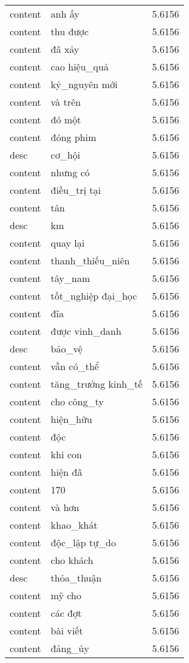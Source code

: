 \documentclass{article}
\begin{document}
\begin{tabular}{lll}
content & anh ấy & 5.6156\\
content & thu được & 5.6156\\
content & đã xảy & 5.6156\\
content & cao hiệu\_quả & 5.6156\\
content & kỷ\_nguyên mới & 5.6156\\
content & và trên & 5.6156\\
content & đó một & 5.6156\\
content & đóng phim & 5.6156\\
desc & cơ\_hội & 5.6156\\
content & nhưng có & 5.6156\\
content & điều\_trị tại & 5.6156\\
content & tân & 5.6156\\
desc & km & 5.6156\\
content & quay lại & 5.6156\\
content & thanh\_thiếu\_niên & 5.6156\\
content & tây\_nam & 5.6156\\
content & tốt\_nghiệp đại\_học & 5.6156\\
content & đĩa & 5.6156\\
content & được vinh\_danh & 5.6156\\
desc & bảo\_vệ & 5.6156\\
content & vẫn có\_thể & 5.6156\\
content & tăng\_trưởng kinh\_tế & 5.6156\\
content & cho công\_ty & 5.6156\\
content & hiện\_hữu & 5.6156\\
content & độc & 5.6156\\
content & khi con & 5.6156\\
content & hiện đã & 5.6156\\
content & 170 & 5.6156\\
content & và hơn & 5.6156\\
content & khao\_khát & 5.6156\\
content & độc\_lập tự\_do & 5.6156\\
content & cho khách & 5.6156\\
desc & thỏa\_thuận & 5.6156\\
content & mỹ cho & 5.6156\\
content & các đợt & 5.6156\\
content & bài viết & 5.6156\\
content & đảng\_ủy & 5.6156\\

\end{tabular}
\end{document}
